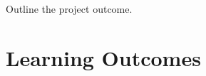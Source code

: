 \documentclass{4thYearProject}
\begin{document}
Outline the project outcome. 

\section{Learning Outcomes}






\begin{appendices}
\end{appendices}
\end{document}
